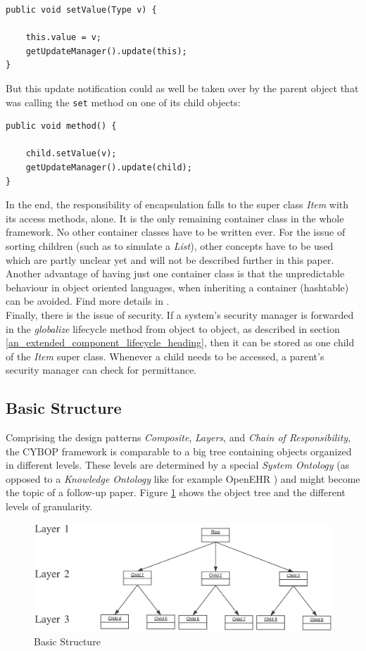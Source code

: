 \begin{verbatim}
public void setValue(Type v) {

    this.value = v;
    getUpdateManager().update(this);
}
\end{verbatim}

But this update notification could as well be taken over by the parent object
that was calling the \texttt{set} method on one of its child objects:

\begin{verbatim}
public void method() {

    child.setValue(v);
    getUpdateManager().update(child);
}
\end{verbatim}

In the end, the responsibility of encapsulation falls to the super class
\emph{Item} with its access methods, alone. It is the only remaining container
class in the whole framework. No other container classes have to be written ever.
For the issue of sorting children (such as to simulate a \emph{List}), other
concepts have to be used which are partly unclear yet and will not be described
further in this paper.\\
Another advantage of having just one container class is that the unpredictable
behaviour in object oriented languages, when inheriting a container (hashtable)
can be avoided. Find more details in \cite{javaiaq}.\\
Finally, there is the issue of security. If a system's security manager is
forwarded in the \emph{globalize} lifecycle method from object to object, as
described in section \ref{an_extended_component_lifecycle_heading}, then it can
be stored as one child of the \emph{Item} super class. Whenever a child needs
to be accessed, a parent's security manager can check for permittance.

\subsection{Basic Structure}
\label{basic_structure_heading}

Comprising the design patterns \emph{Composite}, \emph{Layers}, and
\emph{Chain of Responsibility}, the CYBOP framework is comparable to a big tree
containing objects organized in different levels. These levels are determined by
a special \emph{System Ontology} (as opposed to a \emph{Knowledge Ontology} like
for example OpenEHR \cite{openehr}) and might become the topic of a follow-up
paper. Figure \ref{basic_structure_figure} shows the object tree and the different
levels of granularity.

\begin{figure}[ht]
    \begin{center}
       \includegraphics[scale=0.3]{eps/framework-structure.eps}
       \caption{Basic Structure}
       \label{basic_structure_figure}
    \end{center}
\end{figure}

